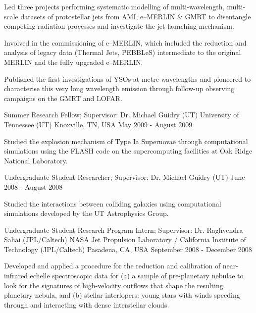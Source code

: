 \begin{cventries}
{\begin{cvitems}
        \item {Led three projects performing systematic modelling of multi-wavelength, multi-scale datasets of protostellar jets from AMI, e--MERLIN \& GMRT to disentangle competing radiation processes and investigate the jet launching mechanism.}
        \item {Involved in the commissioning of e--MERLIN, which included the reduction and analysis of legacy data (Thermal Jets, PEBBLeS) intermediate to the original MERLIN and the fully upgraded e--MERLIN.}
        \item {Published the first investigations of YSOs at metre wavelengths and pioneered to characterise this very long wavelength emission through follow-up observing campaigns on the GMRT and LOFAR.}
      \end{cvitems} 
    }
\cventry
    {Summer Research Fellow; Supervisor: Dr. Michael Guidry (UT)}
    {University of Tennessee (UT)}
    {Knoxville, TN, USA}
    {May 2009 - August 2009}
    {
      \begin{cvitems}
        \item {Studied the explosion mechanism of Type Ia Supernovae through computational simulations using the FLASH code on the supercomputing facilities at Oak Ridge National Laboratory.}
      \end{cvitems}
    }
\cventry
    {Undergraduate Student Researcher; Supervisor: Dr. Michael Guidry (UT)}
    {}
    {}
    {June 2008 - August 2008}
    {
      \begin{cvitems}
        \item {Studied the interactions between colliding galaxies using computational simulations developed by the UT Astrophysics Group.}
      \end{cvitems}
    }
\cventry
    {Undergraduate Student Research Program Intern; Supervisor: Dr. Raghvendra Sahai (JPL/Caltech)}
    {NASA Jet Propulsion Laboratory / California Institute of Technology (JPL/Caltech)}
    {Pasadena, CA, USA}
    {September 2008 - December 2008}
    {
      \begin{cvitems}
        \item {Developed and applied a procedure for the reduction and calibration of near-infrared echelle spectroscopic data for (a)  a sample of pre-planetary nebulae to look for the signatures of high-velocity outflows that shape the resulting planetary nebula, and (b) stellar interlopers: young stars with winds speeding through and interacting with dense interstellar clouds.}
      \end{cvitems}
    }
\end{cventries}
